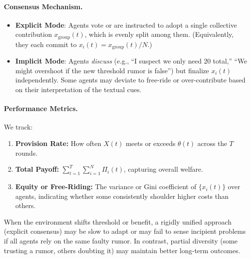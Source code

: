 \paragraph{Consensus Mechanism.}
\begin{itemize}
    \item \textbf{Explicit Mode}: Agents vote or are instructed to adopt a single collective contribution $x_{\mathrm{group}}(t)$, which is evenly split among them. (Equivalently, they each commit to $x_i(t) = x_{\mathrm{group}}(t)/N$.)
    \item \textbf{Implicit Mode}: Agents \emph{discuss} (e.g., “I suspect we only need 20 total,” “We might overshoot if the new threshold rumor is false”) but finalize $x_i(t)$ independently. Some agents may deviate to free-ride or over-contribute based on their interpretation of the textual cues.
\end{itemize}

\paragraph{Performance Metrics.}
We track:
\begin{enumerate}
    \item \textbf{Provision Rate:} How often $X(t)$ meets or exceeds $\theta(t)$ across the $T$ rounds.  
    \item \textbf{Total Payoff:} $\sum_{t=1}^T \sum_{i=1}^N \Pi_i(t)$, capturing overall welfare.  
    \item \textbf{Equity or Free-Riding:} The variance or Gini coefficient of $\{x_i(t)\}$ over agents, indicating whether some consistently shoulder higher costs than others.  
\end{enumerate}
When the environment shifts threshold or benefit, a rigidly unified approach (explicit consensus) may be slow to adapt or may fail to sense incipient problems if all agents rely on the same faulty rumor. In contrast, partial diversity (some trusting a rumor, others doubting it) may maintain better long-term outcomes.

